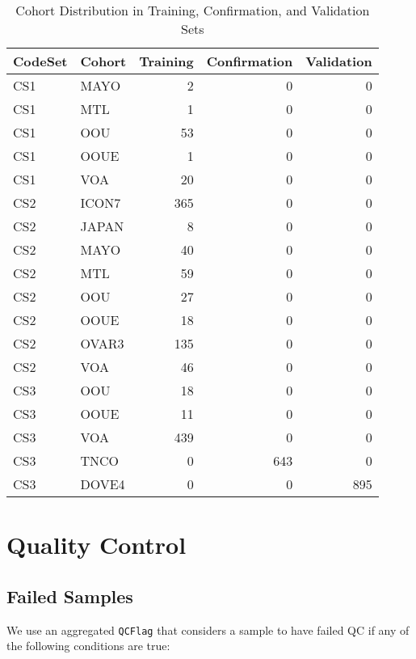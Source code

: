 \documentclass[
]{report}
\begin{document}
\begin{table}

\caption{\label{tab:cohort-dist}Cohort Distribution in Training, Confirmation, and Validation Sets}
\centering
\begin{tabular}[t]{l|l|r|r|r}
\hline
CodeSet & Cohort & Training & Confirmation & Validation\\
\hline
CS1 & MAYO & 2 & 0 & 0\\
\hline
CS1 & MTL & 1 & 0 & 0\\
\hline
CS1 & OOU & 53 & 0 & 0\\
\hline
CS1 & OOUE & 1 & 0 & 0\\
\hline
CS1 & VOA & 20 & 0 & 0\\
\hline
CS2 & ICON7 & 365 & 0 & 0\\
\hline
CS2 & JAPAN & 8 & 0 & 0\\
\hline
CS2 & MAYO & 40 & 0 & 0\\
\hline
CS2 & MTL & 59 & 0 & 0\\
\hline
CS2 & OOU & 27 & 0 & 0\\
\hline
CS2 & OOUE & 18 & 0 & 0\\
\hline
CS2 & OVAR3 & 135 & 0 & 0\\
\hline
CS2 & VOA & 46 & 0 & 0\\
\hline
CS3 & OOU & 18 & 0 & 0\\
\hline
CS3 & OOUE & 11 & 0 & 0\\
\hline
CS3 & VOA & 439 & 0 & 0\\
\hline
CS3 & TNCO & 0 & 643 & 0\\
\hline
CS3 & DOVE4 & 0 & 0 & 895\\
\hline
\end{tabular}
\end{table}

\section{Quality Control}\label{quality-control-1}

\subsection{Failed Samples}\label{failed-samples}

We use an aggregated \texttt{QCFlag} that considers a sample to have failed QC if any of the following conditions are true:
\end{document}
